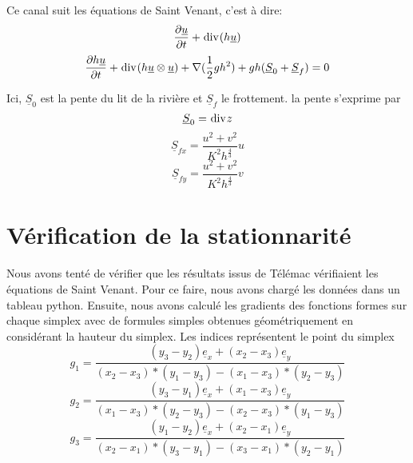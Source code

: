 \documentclass[a4paper,10pt]{article}
\begin{document}
  Ce canal suit les équations de Saint Venant, c'est à dire:
  \begin{equation}
    \frac {\partial \underline u} {\partial t}
    +\bdiv(h \underline u)
  \end{equation}
  \begin{equation}
    \frac{\partial h\underline u}{\partial t}
    + \bdiv(h \underline u \otimes \underline u)
    + \nabla(\frac 1 2 g h^2)
    + g h (\underline S_0 + \underline S_f)
    = 0
  \end{equation}
  
  Ici, $\underline S_0$ est la pente du lit de la rivière et $\underline S_f$ le frottement.
  la pente s'exprime par
  \begin{equation}
   \underline S_0 = \bdiv z
  \end{equation}
  \begin{equation}
    \underline S_{fx} =
    \frac {u^2 + v^2} {K^2 h^{\frac 4 3}} u
  \end{equation}
  \begin{equation}
    \underline S_{fy} = \frac {u^2 + v^2} {K^2 h^{\frac 4 3}} v
  \end{equation}
  \section{Vérification de la stationnarité}
  Nous avons tenté de vérifier que les résultats issus de Télémac vérifiaient les équations de Saint Venant.
  Pour ce faire, nous avons chargé les données dans un tableau python. Ensuite, nous avons calculé les gradients des fonctions
  formes sur chaque simplex avec de formules simples obtenues géométriquement en considérant la hauteur du simplex.
  Les indices représentent le point du simplex
  \begin{equation}
    g_1 =
    \frac{(y_3 - y_2) \underline e_x + (x_2 - x_3) \underline e_y}
    {(x_2 - x_3) * (y_1 - y_3) - (x_1 - x_3) * (y_2 - y_3)}
  \end{equation}
  \begin{equation}
    g_2 =
    \frac{(y_3 - y_1) \underline e_x + (x_1 - x_3) \underline e_y}
    {(x_1 - x_3) * (y_2 - y_3) - (x_2 - x_3) * (y_1 - y_3)}
  \end{equation}
  \begin{equation}
    g_3 =
    \frac{(y_1 - y_2) \underline e_x + (x_2 - x_1) \underline e_y}
    {(x_2 - x_1) * (y_3 - y_1) - (x_3 - x_1) * (y_2 - y_1)}
  \end{equation}
  
\end{document}
